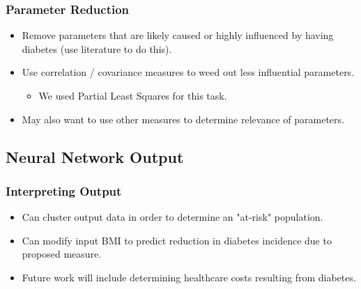 \documentclass{beamer}
\begin{document}
\frame
{
 \frametitle{Parameter Reduction}

  \begin{itemize}
  \item {Remove parameters that are likely caused or highly influenced by having diabetes (use literature to do this).}
  \item {Use correlation / covariance measures to weed out less influential parameters.}
  	\begin{itemize}
 	 \item {We used Partial Least Squares for this task.}
	\end{itemize}
  \item{May also want to use other measures to determine relevance of parameters.}
  \end{itemize}
}

\subsection{Neural Network Output}
\frame
{
\frametitle{Interpreting Output}
  \begin{itemize}
  \item {Can cluster output data in order to determine an "at-risk" population.}
  \item {Can modify input BMI to predict reduction in diabetes incidence due to proposed measure.}
  \item {Future work will include determining healthcare costs resulting from diabetes.}
  \end{itemize}
}

\end{document}
